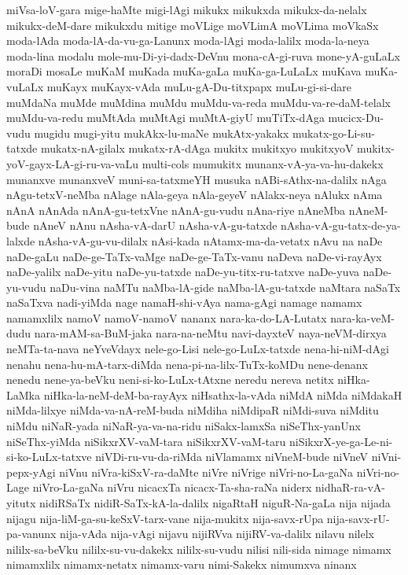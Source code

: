 {miVsa-loV-gara
mige-haMte
migi-lAgi
mikukx
mikukxda
mikukx-da-nelalx
mikukx-deM-dare
mikukxdu
mitige
moVLige
moVLimA
moVLima
moVkaSx
moda-lAda
moda-lA-da-vu-ga-Lanunx
moda-lAgi
moda-lalilx
moda-la-neya
moda-lina
modalu
mole-mu-Di-yi-dadx-DeVnu
mona-cA-gi-ruva
mone-yA-guLaLx
moraDi
mosaLe
muKaM
muKada
muKa-gaLa
muKa-ga-LuLaLx
muKava
muKa-vuLaLx
muKayx
muKayx-vAda
muLu-gA-Du-titxpapx
muLu-gi-si-dare
muMdaNa
muMde
muMdina
muMdu
muMdu-va-reda
muMdu-va-re-daM-telalx
muMdu-va-redu
muMtAda
muMtAgi
muMtA-giyU
muTiTx-dAga
mucicx-Du-vudu
mugidu
mugi-yitu
mukAkx-lu-maNe
mukAtx-yakakx
mukatx-go-Li-su-tatxde
mukatx-nA-gilalx
mukatx-rA-dAga
mukitx
mukitxyo
mukitxyoV
mukitx-yoV-gayx-LA-gi-ru-va-vaLu
multi-cols
mumukitx
munanx-vA-ya-va-hu-dakekx
munanxve
munanxveV
muni-sa-tatxmeYH
musuka
nABi-sAthx-na-dalilx
nAga
nAgu-tetxV-neMba
nAlage
nAla-geya
nAla-geyeV
nAlakx-neya
nAlukx
nAma
nAnA
nAnAda
nAnA-gu-tetxVne
nAnA-gu-vudu
nAna-riye
nAneMba
nAneM-bude
nAneV
nAnu
nAsha-vA-darU
nAsha-vA-gu-tatxde
nAsha-vA-gu-tatx-de-ya-lalxde
nAsha-vA-gu-vu-dilalx
nAsi-kada
nAtamx-ma-da-vetatx
nAvu
na
naDe
naDe-gaLu
naDe-ge-TaTx-vaMge
naDe-ge-TaTx-vanu
naDeva
naDe-vi-rayAyx
naDe-yalilx
naDe-yitu
naDe-yu-tatxde
naDe-yu-titx-ru-tatxve
naDe-yuva
naDe-yu-vudu
naDu-vina
naMTu
naMba-lA-gide
naMba-lA-gu-tatxde
naMtara
naSaTx
naSaTxva
nadi-yiMda
nage
namaH-shi-vAya
nama-gAgi
namage
namamx
namamxlilx
namoV
namoV-namoV
nananx
nara-ka-do-LA-Lutatx
nara-ka-veM-dudu
nara-mAM-sa-BuM-jaka
nara-na-neMtu
navi-dayxteV
naya-neVM-dirxya
neMTa-ta-nava
neYveVdayx
nele-go-Lisi
nele-go-LuLx-tatxde
nena-hi-niM-dAgi
nenahu
nena-hu-mA-tarx-diMda
nena-pi-na-lilx-TuTx-koMDu
nene-denanx
nenedu
nene-ya-beVku
neni-si-ko-LuLx-tAtxne
neredu
nereva
netitx
niHka-LaMka
niHka-la-neM-deM-ba-rayAyx
niHsathx-la-vAda
niMdA
niMda
niMdakaH
niMda-lilxye
niMda-va-nA-reM-buda
niMdiha
niMdipaR
niMdi-suva
niMditu
niMdu
niNaR-yada
niNaR-ya-va-na-ridu
niSakx-lamxSa
niSeThx-yanUnx
niSeThx-yiMda
niSikxrXV-vaM-tara
niSikxrXV-vaM-taru
niSikxrX-ye-ga-Le-ni-si-ko-LuLx-tatxve
niVDi-ru-vu-da-riMda
niVlamamx
niVneM-bude
niVneV
niVni-pepx-yAgi
niVnu
niVra-kiSxV-ra-daMte
niVre
niVrige
niVri-no-La-gaNa
niVri-no-Lage
niVro-La-gaNa
niVru
nicacxTa
nicacx-Ta-sha-raNa
niderx
nidhaR-ra-vA-yitutx
nidiRSaTx
nidiR-SaTx-kA-la-dalilx
nigaRtaH
niguR-Na-gaLa
nija
nijada
nijagu
nija-liM-ga-su-keSxV-tarx-vane
nija-mukitx
nija-savx-rUpa
nija-savx-rU-pa-vanunx
nija-vAda
nija-vAgi
nijavu
nijiRVva
nijiRV-va-dalilx
nilavu
nilelx
nililx-sa-beVku
nililx-su-vu-dakekx
nililx-su-vudu
nilisi
nili-sida
nimage
nimamx
nimamxlilx
nimamx-netatx
nimamx-varu
nimi-Sakekx
nimumxva
ninanx
}
